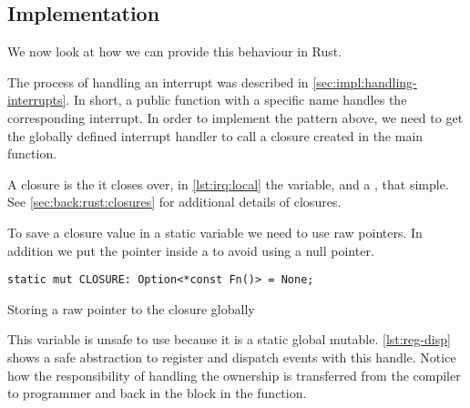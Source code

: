 \subsection{Implementation}
We now look at how we can provide this behaviour in Rust.

The process of handling an interrupt was described in \autoref{sec:impl:handling-interrupts}.
In short, a public function with a specific name handles the corresponding interrupt.
In order to implement the pattern above, we need to get the globally defined interrupt handler  to call a closure created in the main function.

A closure is the  it closes over, in \autoref{lst:irq:local} the  variable, and a , that simple.
See \autoref{sec:back:rust:closures} for additional details of closures.

To save a closure value in a static variable we need to use raw pointers.
In addition we put the pointer inside a  to avoid using a null pointer.

\begin{listing}[H]
  \begin{verbatim}
static mut CLOSURE: Option<*const Fn()> = None;
  \end{verbatim}
  \caption{Storing a raw pointer to the closure globally}
  \label{lst:raw-global-pointer-to-closure}
\end{listing}

This variable is unsafe to use because it is a static global mutable.
\autoref{lst:reg-disp} shows a safe abstraction to register and dispatch events with this handle.
Notice how the responsibility of handling the ownership is transferred from the compiler to programmer and back in the {\unsafe} block in the  function.

